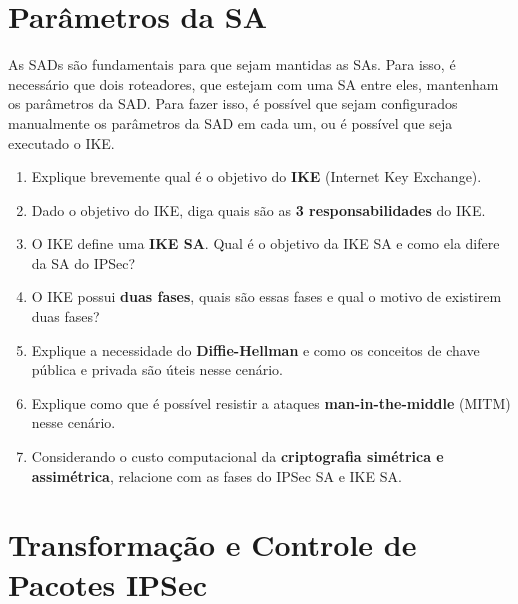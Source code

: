 \section{Parâmetros da SA}
As SADs são fundamentais para que sejam mantidas as SAs. Para isso, é necessário que dois roteadores, que estejam com uma SA entre eles, mantenham os parâmetros da SAD. Para fazer isso, é possível que sejam configurados manualmente os parâmetros da SAD em cada um, ou é possível que seja executado o IKE.

\begin{enumerate}
    \item Explique brevemente qual é o objetivo do \textbf{IKE} (Internet Key Exchange).
    \item Dado o objetivo do IKE, diga quais são as \textbf{3 responsabilidades} do IKE.
    \item O IKE define uma \textbf{IKE SA}. Qual é o objetivo da IKE SA e como ela difere da SA do IPSec?
    \item O IKE possui \textbf{duas fases}, quais são essas fases e qual o motivo de existirem duas fases?
    \item Explique a necessidade do \textbf{Diffie-Hellman} e como os conceitos de chave pública e privada são úteis nesse cenário.
    \item Explique como que é possível resistir a ataques \textbf{man-in-the-middle} (MITM) nesse cenário.
    \item Considerando o custo computacional da \textbf{criptografia simétrica e assimétrica}, relacione com as fases do IPSec SA e IKE SA.
\end{enumerate}

\section{Transformação e Controle de Pacotes IPSec}


